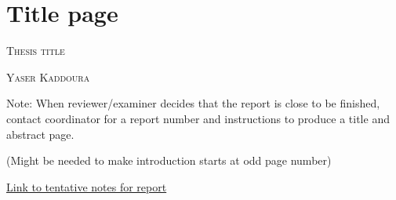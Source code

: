 \documentclass[a4paper, 12pt]{article}
\begin{document}

\thispagestyle{empty}
\section*{Title page}

\textsc{\large Thesis title }

\textsc{\large Yaser Kaddoura}

Note: When reviewer/examiner decides that the report is close to be finished,
contact coordinator for a report number and instructions to produce a title and
abstract page.

\newpage\null\thispagestyle{blank}\newpage

\thispagestyle{empty}


\newpage\null\thispagestyle{blank}\newpage

\tableofcontents

\newpage

\listoffigures

\newpage

\listoftables
\newpage




\newpage
\newpage\null(Might be needed to make introduction starts at odd page number)
\thispagestyle{blank}\newpage





\newpage



\newpage

\href{https://gist.github.com/YasserKa/cb39b763ff9484e73ba82003c9aae2eb}{Link to tentative notes for report}

\newpage

\printbibliography[heading=bibintoc, title={References}]
\newpage


\end{document}
